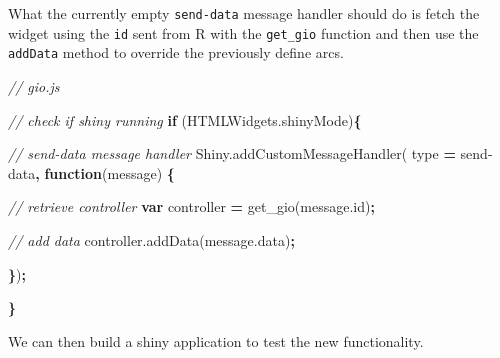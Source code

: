 \documentclass[
  10pt,
]{krantz}
\makeatletter
\newenvironment{Shaded}{\begin{snugshade}}{\end{snugshade}}
\newcommand{\AttributeTok}[1]{\textcolor[rgb]{0.61,0.61,0.61}{#1}}
\newcommand{\CommentTok}[1]{\textcolor[rgb]{0.37,0.37,0.37}{\textit{#1}}}
\newcommand{\ControlFlowTok}[1]{\textcolor[rgb]{0.27,0.27,0.27}{\textbf{#1}}}
\newcommand{\KeywordTok}[1]{\textcolor[rgb]{0.27,0.27,0.27}{\textbf{#1}}}
\newcommand{\NormalTok}[1]{#1}
\newcommand{\OperatorTok}[1]{\textcolor[rgb]{0.43,0.43,0.43}{\textbf{#1}}}
\newcommand{\StringTok}[1]{\textcolor[rgb]{0.5,0.5,0.5}{#1}}
\newcommand{\VariableTok}[1]{\textcolor[rgb]{0,0,0}{#1}}
\newenvironment{kframe}{%
\medskip{}
\setlength{\fboxsep}{.8em}
 \def\at@end@of@kframe{}%
 \ifinner\ifhmode%
  \def\at@end@of@kframe{\end{minipage}}%
  \begin{minipage}{\columnwidth}%
 \fi\fi%
 \def\FrameCommand##1{\hskip\@totalleftmargin \hskip-\fboxsep
 \colorbox{shadecolor}{##1}\hskip-\fboxsep
     \hskip-\linewidth \hskip-\@totalleftmargin \hskip\columnwidth}%
 \MakeFramed {\advance\hsize-\width
   \@totalleftmargin\z@ \linewidth\hsize
   \@setminipage}}%
 {\par\unskip\endMakeFramed%
 \at@end@of@kframe}
\renewenvironment{Shaded}{\begin{kframe}}{\end{kframe}}
\makeatother
\begin{document}
What the currently empty \texttt{send-data} message handler should do is fetch the widget using the \texttt{id} sent from R with the \texttt{get\_gio} function and then use the \texttt{addData} method to override the previously define arcs.

\begin{Shaded}
\begin{Highlighting}[]
\CommentTok{// gio.js}

\CommentTok{// check if shiny running}
\ControlFlowTok{if}\NormalTok{ (}\VariableTok{HTMLWidgets}\NormalTok{.}\AttributeTok{shinyMode}\NormalTok{)}\OperatorTok{\{}

  \CommentTok{// send{-}data message handler}
  \VariableTok{Shiny}\NormalTok{.}\AttributeTok{addCustomMessageHandler}\NormalTok{(}
\NormalTok{    type }\OperatorTok{=} \StringTok{\textquotesingle{}send{-}data\textquotesingle{}}\OperatorTok{,} \KeywordTok{function}\NormalTok{(message) }\OperatorTok{\{}

    \CommentTok{// retrieve controller}
    \KeywordTok{var}\NormalTok{ controller }\OperatorTok{=} \AttributeTok{get\_gio}\NormalTok{(}\VariableTok{message}\NormalTok{.}\AttributeTok{id}\NormalTok{)}\OperatorTok{;}

    \CommentTok{// add data}
    \VariableTok{controller}\NormalTok{.}\AttributeTok{addData}\NormalTok{(}\VariableTok{message}\NormalTok{.}\AttributeTok{data}\NormalTok{)}\OperatorTok{;}

  \OperatorTok{\}}\NormalTok{)}\OperatorTok{;}

\OperatorTok{\}}
\end{Highlighting}
\end{Shaded}

We can then build a shiny application to test the new functionality.
\end{document}
